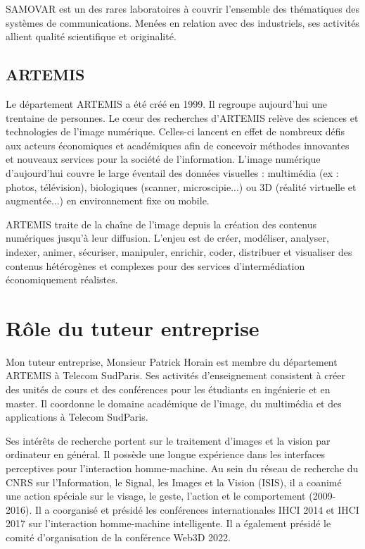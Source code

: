 \documentclass{report}
\begin{document}
{\hspace{1.6cm} SAMOVAR est un des rares laboratoires à couvrir l’ensemble des thématiques des systèmes de communications. Menées en relation avec des industriels, ses activités allient qualité scientifique et originalité.

\subsection{ARTEMIS }
\hspace{1.6cm}Le département ARTEMIS a été créé en 1999. Il regroupe aujourd'hui une trentaine de personnes. Le cœur des recherches d'ARTEMIS relève des sciences et technologies de l'image numérique. Celles-ci lancent en effet de nombreux défis aux acteurs économiques et académiques afin de concevoir méthodes innovantes et nouveaux services pour la société de l'information. L'image numérique d'aujourd'hui couvre le large éventail des données visuelles : multimédia (ex : photos, télévision), biologiques (scanner, microscipie...) ou 3D (réalité virtuelle et augmentée...) en environnement fixe ou mobile.
\vspace*{0.5\baselineskip}

\hspace{1.6cm} ARTEMIS traite de la chaîne de l'image depuis la création des contenus numériques jusqu'à leur diffusion. L'enjeu est de créer, modéliser, analyser, indexer, animer, sécuriser, manipuler, enrichir, coder, distribuer et visualiser des contenus hétérogènes et complexes pour des services d'intermédiation économiquement réalistes.

\section{Rôle du tuteur entreprise }
\hspace{1.6cm} Mon tuteur entreprise, Monsieur Patrick Horain est membre du département ARTEMIS à Telecom SudParis. Ses activités d'enseignement consistent à créer des unités de cours et des conférences pour les étudiants en ingénierie et en master. Il coordonne le domaine académique de l'image, du multimédia et des applications à Telecom SudParis.
\vspace*{0.5\baselineskip}

\hspace{1.6cm}Ses intérêts de recherche portent sur le traitement d'images et la vision par ordinateur en général. Il possède une longue expérience dans les interfaces perceptives pour l'interaction homme-machine. Au sein du réseau de recherche du CNRS sur l'Information, le Signal, les Images et la Vision (ISIS), il a coanimé une action spéciale sur le visage, le geste, l'action et le comportement (2009-2016). Il a coorganisé et présidé les conférences internationales IHCI 2014 et IHCI 2017 sur l'interaction homme-machine intelligente. Il a également présidé le comité d'organisation de la conférence Web3D 2022.

}
\end{document}
